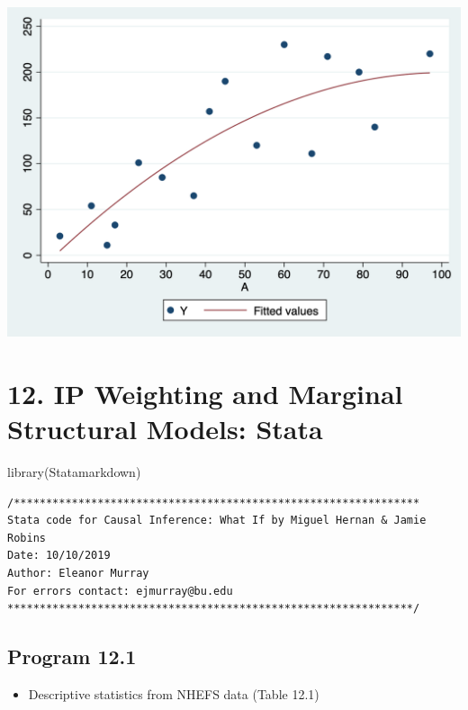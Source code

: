 \documentclass[
  10pt,
  a4paper,
]{book}
\newenvironment{Shaded}{\begin{snugshade}}{\end{snugshade}}
\newcommand{\FunctionTok}[1]{\textcolor[rgb]{0.28,0.35,0.67}{#1}}
\newcommand{\NormalTok}[1]{\textcolor[rgb]{0.00,0.46,0.62}{#1}}
\providecommand{\tightlist}{%
  \setlength{\itemsep}{0pt}\setlength{\parskip}{0pt}}
\begin{document}
\begin{center}\includegraphics[width=0.85\linewidth]{figs/stata-fig-11-5} \end{center}

\hypertarget{ip-weighting-and-marginal-structural-models-stata}{%
\chapter*{12. IP Weighting and Marginal Structural Models: Stata}\label{ip-weighting-and-marginal-structural-models-stata}}

\begin{Shaded}
\begin{Highlighting}[]
\FunctionTok{library}\NormalTok{(Statamarkdown)}
\end{Highlighting}
\end{Shaded}

\begin{verbatim}
/***************************************************************
Stata code for Causal Inference: What If by Miguel Hernan & Jamie Robins
Date: 10/10/2019
Author: Eleanor Murray 
For errors contact: ejmurray@bu.edu
***************************************************************/
\end{verbatim}

\hypertarget{program-12.1-1}{%
\section{Program 12.1}\label{program-12.1-1}}

\begin{itemize}
\tightlist
\item
  Descriptive statistics from NHEFS data (Table 12.1)
\end{itemize}
\end{document}
